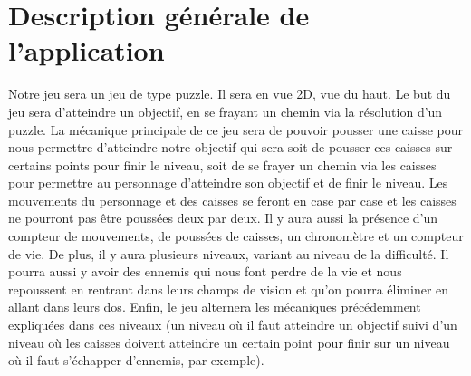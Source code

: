 \section{Description générale de l'application}
Notre jeu sera un jeu de type puzzle. Il sera en vue 2D, vue du haut. Le but du jeu sera d’atteindre un objectif, en se frayant un chemin via la résolution d’un puzzle. La mécanique principale de ce jeu sera de pouvoir pousser une caisse pour 
nous permettre d’atteindre notre objectif qui sera soit de pousser ces caisses sur certains points pour finir le niveau, soit de se frayer un chemin via les caisses pour permettre au personnage d’atteindre son objectif et de finir le niveau. Les 
mouvements du personnage et des caisses se feront en case par case et les caisses ne pourront pas être poussées deux par deux. Il y aura aussi la présence d’un compteur de mouvements, de poussées de caisses, un chronomètre et un compteur de vie. 
De plus, il y aura plusieurs niveaux, variant au niveau de la difficulté. Il pourra aussi y avoir des ennemis qui nous font perdre de la vie et nous repoussent en rentrant dans leurs champs de vision et qu’on pourra éliminer en allant dans leurs dos. 
Enfin, le jeu alternera les mécaniques précédemment expliquées dans ces niveaux (un niveau où il faut atteindre un objectif suivi d’un niveau où les caisses doivent atteindre un certain point pour finir sur un niveau où il faut s’échapper d’ennemis, 
par exemple).
